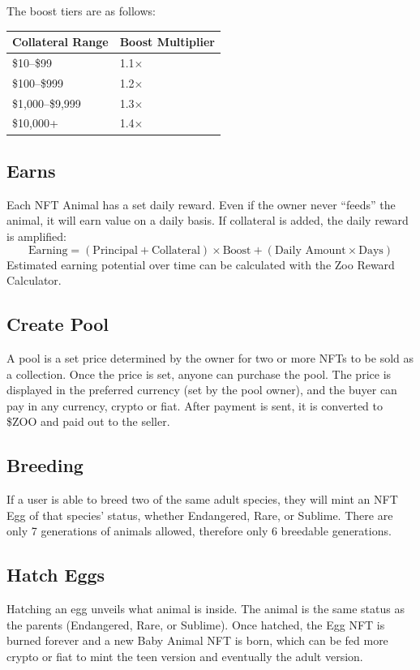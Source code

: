 \noindent The boost tiers are as follows:
\begin{center}
\begin{tabular}{ll}
\toprule
\textbf{Collateral Range} & \textbf{Boost Multiplier} \\
\midrule
\$10--\$99   & 1.1$\times$ \\
\$100--\$999  & 1.2$\times$ \\
\$1{,}000--\$9{,}999 & 1.3$\times$ \\
\$10{,}000+  & 1.4$\times$ \\
\bottomrule
\end{tabular}
\end{center}

\subsection{Earns}
Each NFT Animal has a set daily reward. Even if the owner never ``feeds'' the animal, it will earn value on a daily basis. If collateral is added, the daily reward is amplified:
\begin{equation}
\text{Earning} = (\text{Principal} + \text{Collateral}) \times \text{Boost} + (\text{Daily Amount} \times \text{Days})
\end{equation}
\noindent Estimated earning potential over time can be calculated with the Zoo Reward Calculator.

\subsection{Create Pool}
A pool is a set price determined by the owner for two or more NFTs to be sold as a collection. Once the price is set, anyone can purchase the pool. The price is displayed in the preferred currency (set by the pool owner), and the buyer can pay in any currency, crypto or fiat. After payment is sent, it is converted to \$ZOO and paid out to the seller.

\subsection{Breeding}
If a user is able to breed two of the same adult species, they will mint an NFT Egg of that species' status, whether Endangered, Rare, or Sublime. There are only 7 generations of animals allowed, therefore only 6 breedable generations.

\subsection{Hatch Eggs}
Hatching an egg unveils what animal is inside. The animal is the same status as the parents (Endangered, Rare, or Sublime). Once hatched, the Egg NFT is burned forever and a new Baby Animal NFT is born, which can be fed more crypto or fiat to mint the teen version and eventually the adult version.

